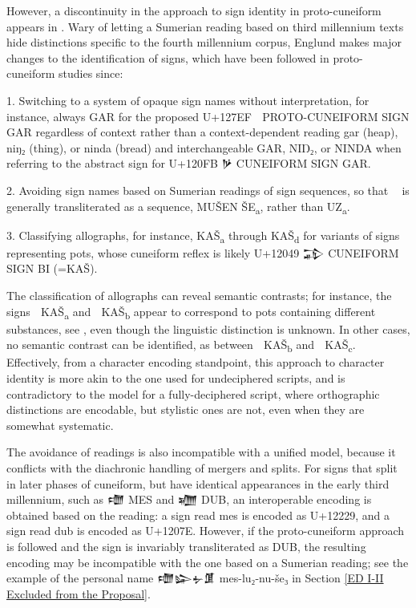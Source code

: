 However, a discontinuity in the approach to sign identity in
proto-cuneiform appears in \cite[347\psqq]{ATU2}. Wary of letting a
Sumerian reading based on third millennium texts hide distinctions
specific to the fourth millennium corpus, Englund makes major changes
to the identification of signs, which have been followed in
proto-cuneiform studies since:

1. Switching to a system of opaque sign names without interpretation,
for instance, always GAR for the proposed U+127EF {\oraccpc 𒟯} PROTO-CUNEIFORM
SIGN GAR regardless of context rather than a context-dependent reading
gar (heap), niŋ₂ (thing), or ninda (bread) and interchangeable GAR,
NIŊ₂, or NINDA when referring to the abstract sign for U+120FB {\oraccnoto 𒃻}
CUNEIFORM SIGN GAR.

2. Avoiding sign names based on Sumerian readings of sign sequences,
so that {\oraccpc 𒤤𒨢} is generally transliterated as a sequence, MUŠEN
ŠE\textsubscript{a}, rather than UZ\textsubscript{a}.

3. Classifying allographs, for instance, KAŠ\textsubscript{a} through
KAŠ\textsubscript{d} for variants of signs representing pots, whose
cuneiform reflex is likely U+12049 {\oraccnoto 𒁉} CUNEIFORM SIGN BI
(=KAŠ).

The classification of allographs can reveal semantic contrasts; for
instance, the signs {\oraccpc 𒢅} KAŠ\textsubscript{a} and {\oraccpc 𒢆}
KAŠ\textsubscript{b} appear to correspond to pots containing different
substances, see \cite[168]{Englund1998}, even though the linguistic
distinction is unknown. In other cases, no semantic contrast can be
identified, as between {\oraccpc 𒢆} KAŠ\textsubscript{b} and {\oraccpc 𒢈}
KAŠ\textsubscript{c}. Effectively, from a character encoding
standpoint, this approach to character identity is more akin to the
one used for undeciphered scripts, and is contradictory to the model
for a fully-deciphered script, where orthographic distinctions are
encodable, but stylistic ones are not, even when they are somewhat
systematic.

The avoidance of readings is also incompatible with a unified model,
because it conflicts with the diachronic handling of mergers and
splits. For signs that split in later phases of cuneiform, but have
identical appearances in the early third millennium, such as
{\oraccnoto 𒈩} MES and {\oraccnoto 𒁾} DUB, an interoperable encoding
is obtained based on the reading: a sign read mes is encoded as
U+12229, and a sign read dub is encoded as U+1207E. However, if the
proto-cuneiform approach is followed and the sign is invariably
transliterated as DUB, the resulting encoding may be incompatible with
the one based on a Sumerian reading; see the example of the personal
name {\oraccnoto 𒈩𒇽𒉡𒂠} mes-lu₂-nu-še₃ in Section
\ref{ED I-II Excluded from the Proposal}.

